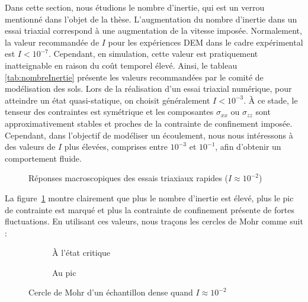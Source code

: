 \documentclass[a4paper,12pt]{report}
\begin{document}
Dans cette section, nous étudions le nombre d’inertie, qui est un verrou mentionné dans l’objet de la thèse.  
L’augmentation du nombre d’inertie dans un essai triaxial correspond à une augmentation de la vitesse imposée.  
Normalement, la valeur recommandée de $I$ pour les expériences DEM dans le cadre expérimental est $I < 10^{-7}$.  
Cependant, en simulation, cette valeur est pratiquement inatteignable en raison du coût temporel élevé.  
Ainsi, le tableau \ref{tab:nombreInertie} présente les valeurs recommandées par le comité de modélisation des sols.  
Lors de la réalisation d’un essai triaxial numérique, pour atteindre un état quasi-statique, on choisit généralement $I < 10^{-3}$.  
À ce stade, le tenseur des contraintes est symétrique et les composantes $\sigma_{xx}$ ou $\sigma_{zz}$ sont approximativement stables et proches de la contrainte de confinement imposée.  
Cependant, dans l’objectif de modéliser un écoulement, nous nous intéressons à des valeurs de $I$ plus élevées, comprises entre $10^{-3}$ et $10^{-1}$, afin d’obtenir un comportement fluide.

\begin{figure}[h!]
\centering \small
\scalebox{0.5}{}
\caption{Réponses macroscopiques des essais triaxiaux rapides ($I \approx 10^{-2}$)}
\label{fig:contrainteRapide}
\end{figure}

La figure~\ref{fig:contrainteRapide} montre clairement que plus le nombre d’inertie est élevé, plus le pic de contrainte est marqué et plus la contrainte de confinement présente de fortes fluctuations.  
En utilisant ces valeurs, nous traçons les cercles de Mohr comme suit :

\begin{figure}[htbp]
    \centering \small
    \begin{subfigure}[b]{0.49\textwidth}
        \centering \small
        \scalebox{0.5}{}
        \caption{À l’état critique}
        \label{fig:muresiduel}
    \end{subfigure}
    \hfill
    \begin{subfigure}[b]{0.49\textwidth}
        \centering \small
        \scalebox{0.5}{}
        \caption{Au pic}
        \label{fig:mutransitore}
    \end{subfigure}
    \caption{Cercle de Mohr d’un échantillon dense quand $I \approx 10^{-2}$}
    \label{fig:CercleDuMohrRapide}
\end{figure}
\end{document}
